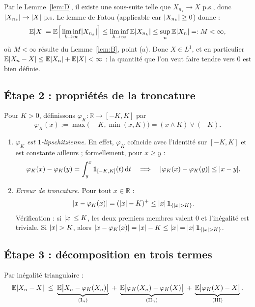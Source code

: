 \documentclass[11pt,a4paper]{article}
\theoremstyle{definition}
\theoremstyle{remark}
\newcommand{\E}{\mathbb{E}}
\newcommand{\R}{\mathbb{R}}
\newcommand{\ind}[1]{\mathbf{1}_{#1}}
\DeclarePairedDelimiter{\abs}{\lvert}{\rvert}
\begin{document}
Par le Lemme~\ref{lem:D}, il existe une sous-suite telle que
$X_{n_k} \to X$ p.s., donc $\abs{X_{n_k}} \to \abs{X}$ p.s. Le lemme de Fatou
(applicable car $\abs{X_{n_k}} \ge 0$) donne :
\[
\E\abs{X}
= \E\Big[\liminf_{k \to \infty} \abs{X_{n_k}}\Big]
\le \liminf_{k \to \infty} \E\abs{X_{n_k}}
\le \sup_{n} \E\abs{X_n} =: M < \infty,
\]
où $M < \infty$ résulte du Lemme~\ref{lem:B}, point (a). Donc $X \in L^1$, et en
particulier $\E\abs{X_n - X} \le \E\abs{X_n} + \E\abs{X} < \infty$ : la quantité
que l'on veut faire tendre vers $0$ est bien définie.

\subsection{Étape 2 : propriétés de la troncature}

Pour $K > 0$, définissons $\varphi_K : \R \to [-K, K]$ par
\[
\varphi_K(x) := \max\big(-K, \min(x, K)\big) = (x \wedge K) \vee (-K).
\]

\begin{enumerate}[label=(\roman*)]
\item \emph{$\varphi_K$ est $1$-lipschitzienne.} En effet, $\varphi_K$ coïncide
avec l'identité sur $[-K,K]$ et est constante ailleurs ; formellement, pour
$x \ge y$ :
\[
\varphi_K(x) - \varphi_K(y) = \int_y^x \ind{[-K,K]}(t)\, \mathrm{d}t
\quad\Longrightarrow\quad
\abs{\varphi_K(x) - \varphi_K(y)} \le \abs{x - y}.
\]
\item \emph{Erreur de troncature.} Pour tout $x \in \R$ :
\begin{equation}\label{eq:tronc}
\abs{x - \varphi_K(x)} = (\abs{x} - K)^+ \le \abs{x}\,\ind{\{\abs{x} > K\}}.
\end{equation}
Vérification : si $\abs{x} \le K$, les deux premiers membres valent $0$ et
l'inégalité est triviale. Si $\abs{x} > K$, alors
$\abs{x - \varphi_K(x)} = \abs{x} - K \le \abs{x} = \abs{x}\,\ind{\{\abs{x}>K\}}$.
\end{enumerate}

\subsection{Étape 3 : décomposition en trois termes}

Par inégalité triangulaire :
\begin{equation}\label{eq:decomp}
\E\abs{X_n - X}
\;\le\;
\underbrace{\E\big|X_n - \varphi_K(X_n)\big|}_{(\mathrm{I}_n)}
\;+\;
\underbrace{\E\big|\varphi_K(X_n) - \varphi_K(X)\big|}_{(\mathrm{II}_n)}
\;+\;
\underbrace{\E\big|\varphi_K(X) - X\big|}_{(\mathrm{III})}.
\end{equation}
\end{document}
